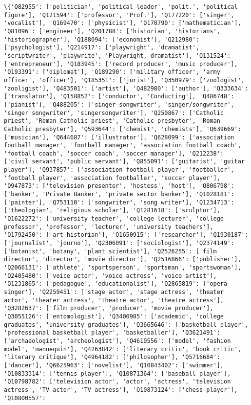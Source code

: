 \documentclass[11pt]{article}
\begin{document}
    \begin{Verbatim}[commandchars=\\\{\}]
\{'Q82955': ['politician', 'political leader', 'polit.', 'political figure'], 'Q121594': ['professor', 'Prof.'], 'Q177220': ['singer', 'vocalist'], 'Q169470': ['physicist'], 'Q170790': ['mathematician'], 'Q81096': ['engineer'], 'Q201788': ['historian', 'historians', 'historiographer'], 'Q188094': ['economist'], 'Q212980': ['psychologist'], 'Q214917': ['playwright', 'dramatist', 'scriptwriter', 'playwrite', 'Playwright, dramatist'], 'Q131524': ['entrepreneur'], 'Q183945': ['record producer', 'music producer'], 'Q193391': ['diplomat'], 'Q189290': ['military officer', 'army officer', 'officer'], 'Q185351': ['jurist'], 'Q350979': ['zoologist', 'zooligist'], 'Q483501': ['artist'], 'Q482980': ['author'], 'Q333634': ['translator'], 'Q158852': ['conductor', 'Conducting'], 'Q486748': ['pianist'], 'Q488205': ['singer-songwriter', 'singer/songwriter', 'singer songwriter', 'singersongwriter'], 'Q250867': ['Catholic priest', 'Roman Catholic priest', 'Catholic presbyter', 'Roman Catholic presbyter'], 'Q593644': ['chemist', 'chemists'], 'Q639669': ['musician'], 'Q644687': ['illustrator'], 'Q628099': ['association football manager', 'football manager', 'association football coach', 'football coach', 'soccer coach', 'soccer manager'], 'Q212238': ['civil servant', 'public servant'], 'Q855091': ['guitarist', 'guitar player'], 'Q937857': ['association football player', 'footballer', 'football player', 'association footballer', 'soccer player'], 'Q947873': ['television presenter', 'hostess', 'host'], 'Q806798': ['banker', 'Private Banker', 'private sector banker'], 'Q1028181': ['painter'], 'Q753110': ['songwriter', 'song writer'], 'Q1234713': ['theologian', 'religious scholar'], 'Q1281618': ['sculptor'], 'Q1622272': ['university teacher', 'college lecturer', 'college professor', 'professor', 'lecturer', 'university teachers'], 'Q1792450': ['art historian'], 'Q1650915': ['researcher'], 'Q1930187': ['journalist', 'journo'], 'Q2306091': ['sociologist'], 'Q2374149': ['botanist', 'botany', 'plant scientist'], 'Q2526255': ['film director', 'director', 'movie director'], 'Q2516866': ['publisher'], 'Q2066131': ['athlete', 'sportsperson', 'sportsman', 'sportswoman'], 'Q2405480': ['voice actor', 'voice actress', 'voice artist'], 'Q1231865': ['pedagogue', 'educationalist'], 'Q2865819': ['opera singer'], 'Q2259451': ['stage actor', 'stage actress', 'theater actor', 'theater actress', 'theatre actor', 'theatre actress'], 'Q3282637': ['film producer', 'producer', 'movie producer'], 'Q3055126': ['entomologist'], 'Q3400985': ['academic', 'college graduates', 'university graduates'], 'Q3665646': ['basketball player', 'professional basketball player', 'basketballer'], 'Q3621491': ['archaeologist', 'archeologist'], 'Q4610556': ['model', 'fashion model', 'mannequin'], 'Q4263842': ['literary critic', 'book critic', 'literary critique'], 'Q4964182': ['philosopher'], 'Q5716684': ['dancer'], 'Q6625963': ['novelist'], 'Q10843402': ['swimmer'], 'Q10833314': ['tennis player'], 'Q10871364': ['baseball player'], 'Q10798782': ['television actor', 'actor', 'actress', 'television actress', 'TV actor', 'TV actress'], 'Q10873124': ['chess player'], 'Q10800557': 
\end{Verbatim}
\end{document}
